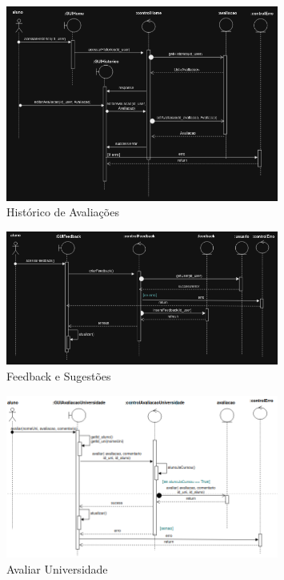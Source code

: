 \documentclass[12pt]{article}
\begin{document}
\begin{figure}[H]
    \centering
    \includegraphics[width=0.8\textwidth]{diagramas/i9-historico-avaliacoes.png}
    \caption{Histórico de Avaliações}
    \label{fig:i9-historico-avaliacoes}
\end{figure}

\begin{figure}[H]
    \centering
    \includegraphics[width=0.8\textwidth]{diagramas/i10-feedback-sugestoes.png}
    \caption{Feedback e Sugestões}
    \label{fig:i10-feedback-sugestoes}
\end{figure}

\begin{figure}[H]
  \centering
  \includegraphics[width=0.8\textwidth]{diagramas/i11-avaliar-univ.png}
  \caption{Avaliar Universidade}
  \label{fig:i11-avaliar-univ}
\end{figure}
\end{document}

